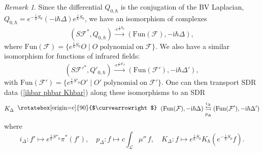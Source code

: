 \documentclass{amsart}
\theoremstyle{plain} %
\theoremstyle{definition}
\theoremstyle{remark}
\newtheorem{rem}[thm]{Remark}
\newcommand{\mr}{\mathrm}
\newcommand{\bt}{\bullet}
\newcommand{\F}{\mathcal{F}}
\newcommand{\LL}{\mathcal{L}}
\newcommand{\xra}{\xrightarrow}
\newcommand{\iii}{\mathrm{i}}
\newcommand{\SDR}[5]{#5\;\;\raisebox{1.3pt}{\rotatebox[origin=c]{90}{$\curvearrowright$}}\;\; #1 \underset{#4}{\stackrel{#3}{\leftrightarrows}} #2}  %
\begin{document}

\begin{rem}
    Since the differential $Q_{0,\hbar}$ is the conjugation of the BV Laplacian, $Q_{0,\hbar}=e^{-\frac{\iii}{\hbar}S_0}(-\iii\hbar \Delta)e^{\frac{\iii}{\hbar}S_0}$, we have an isomorphism of complexes
    \begin{equation}
        (S\F^*,Q_{0,\hbar}) \xra{\cdot e^{\frac{\iii}{\hbar}S_0}} (\mr{Fun}(\F),-\iii\hbar\Delta),
    \end{equation}
    where $\mr{Fun}(\F)=\{e^{\frac{\iii}{\hbar}S_0}O\;|\; O\;\mr{polynomial\;on\;}\F\}$. We also have a similar isomorphism for functions of infrared fields:
    \begin{equation}
        (S\F'^*,Q'_{0,\hbar}) \xra{\cdot e^{\frac{\iii}{\hbar}S'_0}} (\mr{Fun}(\F'),-\iii\hbar\Delta'),
    \end{equation}
    with $\mr{Fun}(\F')=\{e^{\frac{\iii}{\hbar}S'_0}O'\;|\; O'\;\mr{polynomial\;on\;}\F'\}$. One can then transport SDR data (\ref{ihbar phbar Khbar}) along these isomorphisms to an SDR
    \begin{equation}\label{SDR Delta}
        \SDR{(\mr{Fun}(\F),-\iii\hbar\Delta)}{(\mr{Fun}(\F'),-\iii\hbar\Delta')}{i_\Delta}{p_\Delta}{K_\Delta}%
    \end{equation}
    where
    \begin{equation}\label{ipK Delta}
        i_\Delta
        \colon f'\mapsto e^{\frac{\iii}{\hbar}S''_0}\pi^*(f'),
        \quad
        p_\Delta
        \colon f\mapsto c\int_\LL \mu''\,f,
        \quad
        K_\Delta
        \colon f\mapsto e^{\frac{\iii}{\hbar}S_0}K_\hbar(e^{-\frac{\iii}{\hbar}S_0}f).
    \end{equation}

\end{rem}
\end{document}
